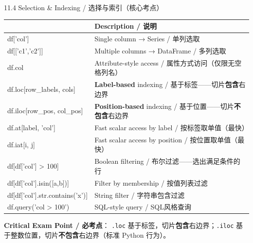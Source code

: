 \documentclass[11pt,a4paper]{report}
\let\oldtexttt\texttt
\renewcommand{\texttt}[1]{\textcolor{mainblue}{\oldtexttt{#1}}}
\begin{document}
\begin{cmdsection}{11.4  Selection \& Indexing / 选择与索引（核心考点）}
\normalsize\renewcommand{\arraystretch}{1.4}
\centering
\begin{tabularx}{\textwidth}{@{}>{\ttfamily}l>{\raggedright\arraybackslash}X@{}}
\toprule
\multicolumn{1}{@{}l}{\textbf{Syntax}} & \textbf{Description / 说明} \\ \midrule
df['col']                   & Single column → Series / 单列选取 \\
df[['c1','c2']]             & Multiple columns → DataFrame / 多列选取 \\
df.col                      & Attribute-style access / 属性方式访问（仅限无空格列名） \\
df.loc[row\_labels, cols]    & \textbf{Label-based} indexing / 基于标签——切片\textbf{包含}右边界 \\
df.iloc[row\_pos, col\_pos]   & \textbf{Position-based} indexing / 基于位置——切片\textbf{不包含}右边界 \\
df.at[label, 'col']         & Fast scalar access by label / 按标签取单值（最快） \\
df.iat[i, j]                & Fast scalar access by position / 按位置取单值（最快） \\
df[df['col'] > 100]         & Boolean filtering / 布尔过滤——选出满足条件的行 \\
df[df['col'].isin([a,b])]   & Filter by membership / 按值列表过滤 \\
df[df['col'].str.contains('x')] & String filter / 字符串包含过滤 \\
df.query('col > 100')       & SQL-style query / SQL风格查询 \\
\bottomrule
\end{tabularx}
\medskip
\textbf{Critical Exam Point / 必考点}：
\texttt{.loc} 基于标签，切片\textbf{包含}右边界；\texttt{.iloc} 基于整数位置，切片\textbf{不包含}右边界（标准 Python 行为）。
\end{cmdsection}
\end{document}
